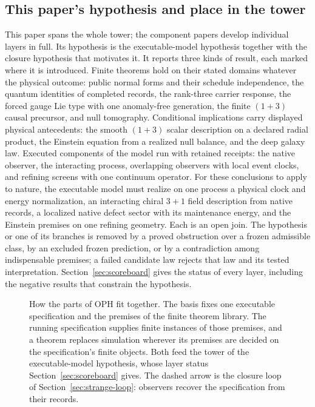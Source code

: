 \documentclass[11pt]{article}
\theoremstyle{definition}
\theoremstyle{remark}
\begin{document}
\subsection{This paper's hypothesis and place in the tower}
\label{sec:place}

This paper spans the whole tower; the component papers develop individual
layers in full. Its hypothesis is the executable-model hypothesis together
with the closure hypothesis that motivates it. It reports three kinds of
result, each marked where it is introduced. Finite theorems hold on their
stated domains whatever the physical outcome: public normal forms and their
schedule independence, the quantum identities of completed records, the
rank-three carrier response, the forced gauge Lie type with one anomaly-free
generation, the finite $(1+3)$ causal precursor, and null tomography.
Conditional implications carry displayed physical antecedents: the smooth
$(1+3)$ scalar description on a declared radial product, the Einstein
equation from a realized null balance, and the deep galaxy law. Executed
components of the model run with retained receipts: the native observer, the
interacting process, overlapping observers with local event clocks, and
refining screens with one continuum operator. For these conclusions to apply
to nature, the executable model must realize on one process a physical clock
and energy normalization, an interacting chiral $3+1$ field description from
native records, a localized native defect sector with its maintenance
energy, and the Einstein premises on one refining geometry. Each is an open
join. The hypothesis or one of its branches is removed by a proved
obstruction over a frozen admissible class, by an excluded frozen prediction,
or by a contradiction among indispensable premises; a failed candidate law
rejects that law and its tested interpretation.
Section~\ref{sec:scoreboard} gives the status of every layer, including the
negative results that constrain the hypothesis.

\begin{figure}[!htb]
\centering

\caption{How the parts of OPH fit together. The basis fixes one executable specification and the premises of the finite theorem library. The running specification supplies finite instances of those premises, and a theorem replaces simulation wherever its premises are decided on the specification's finite objects. Both feed the tower of the executable-model hypothesis, whose layer status Section~\ref{sec:scoreboard} gives. The dashed arrow is the closure loop of Section~\ref{sec:strange-loop}: observers recover the specification from their records.}
\label{fig:structure}
\end{figure}
\end{document}
